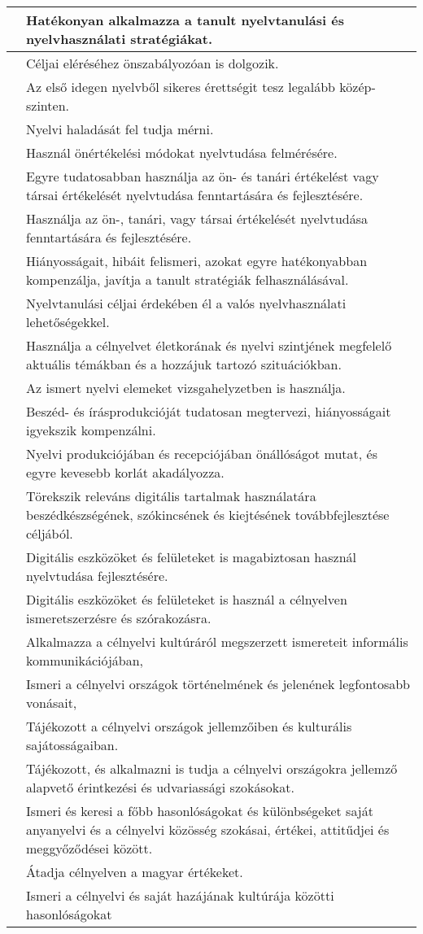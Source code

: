 \begin{longtable}[]{p{\evflength}@{\strut}>{\begin{minipage}{\columnlength}\strut}l<{\strut\end{minipage}}}
\tabularnewline
\hline
&
  Hatékonyan alkalmazza a tanult nyelvtanulási és nyelvhasználati
  stratégiákat.
\tabularnewline
\hline
&
  Céljai eléréséhez önszabályozóan is dolgozik.
\tabularnewline
\hline
&
  Az első idegen nyelvből sikeres érettségit tesz legalább
  közép-\break szinten.
\tabularnewline
\hline
&
  Nyelvi haladását fel tudja mérni.
\tabularnewline
\hline
&
  Használ önértékelési módokat nyelvtudása felmérésére.
\tabularnewline
\hline
&
  Egyre tudatosabban használja az ön- és tanári értékelést vagy társai értékelését
  nyelvtudása fenntartására és fejlesztésére.
\tabularnewline
\hline
&
  Használja az ön-, tanári, vagy társai értékelését nyelvtudása
  fenntartására és fejlesztésére.
\tabularnewline
\hline
&
  Hiányosságait, hibáit felismeri, azokat egyre hatékonyabban
  kompenzálja, javítja a tanult stratégiák felhasználásával.
\tabularnewline
\hline
&
  Nyelvtanulási céljai érdekében él a valós nyelvhasználati
  lehetőségekkel.
\tabularnewline
\hline
&
  Használja a célnyelvet életkorának és nyelvi szintjének megfelelő
  aktuális témákban és a hozzájuk tartozó szituációkban.
\tabularnewline
\hline
&
  Az ismert nyelvi elemeket vizsgahelyzetben is használja.
\tabularnewline
\hline
&
  Beszéd- és írásprodukcióját tudatosan megtervezi, hiányosságait
  igyekszik kompenzálni.
\tabularnewline
\hline
&
  Nyelvi produkciójában és recepciójában önállóságot mutat, és egyre
  kevesebb korlát akadályozza.
\tabularnewline
\hline
&
  Törekszik releváns digitális tartalmak használatára beszédkészségének,
  szókincsének és kiejtésének továbbfejlesztése céljából.
\tabularnewline
\hline
&
  Digitális eszközöket és felületeket is magabiztosan használ
  nyelvtudása fejlesztésére.
\tabularnewline
\hline
&
  Digitális eszközöket és felületeket is használ a célnyelven
  ismeretszerzésre és szórakozásra.
\tabularnewline
\hline
&
  Alkalmazza a célnyelvi kultúráról megszerzett ismereteit informális
  kommunikációjában,
\tabularnewline
\hline
&
  Ismeri a célnyelvi országok történelmének és jelenének legfontosabb
  vonásait,
\tabularnewline
\hline
&
  Tájékozott a célnyelvi országok jellemzőiben és kulturális
  sajátosságaiban.
\tabularnewline
\hline
&
  Tájékozott, és alkalmazni is tudja a célnyelvi országokra jellemző
  alapvető érintkezési és udvariassági szokásokat.
\tabularnewline
\hline
&
  Ismeri és keresi a főbb hasonlóságokat és különbségeket saját
  anyanyelvi és a célnyelvi közösség szokásai, értékei, attitűdjei és
  meggyőződései között.
\tabularnewline
\hline
&
  Átadja célnyelven a magyar értékeket.
\tabularnewline
\hline
&
  Ismeri a célnyelvi és saját hazájának kultúrája közötti hasonlóságokat

\end{longtable}
